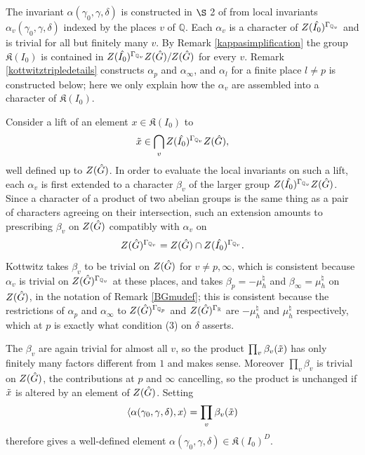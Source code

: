 \documentclass[11pt,a4paper]{article}
\theoremstyle{definition}
\theoremstyle{plain}
\theoremstyle{remark}
\theoremstyle{plain}
\begin{document}
The invariant $\alpha(\gamma_0, \gamma, \delta)$ is constructed in $\S$ 2 of \cite{MR1044820} from local invariants $\alpha_v(\gamma_0,\gamma,\delta)$ indexed by the places $v$ of $\mathbb{Q}$. Each $\alpha_v$ is a character of $Z(\Hat{I_0})^{\Gamma_{\mathbb{Q}_v}}$ and is trivial for all but finitely many $v$. By Remark \ref{kappasimplification} the group $\mathfrak{K}(I_0)$ is contained in $Z(\Hat{I_0})^{\Gamma_{\mathbb{Q}_v}}Z(\Hat{G})/Z(\Hat{G})$ for every $v$. Remark \ref{kottwitztripledetails} constructs $\alpha_p$ and $\alpha_{\infty}$, and $\alpha_l$ for a finite place $l \neq p$ is constructed below; here we only explain how the $\alpha_v$ are assembled into a character of $\mathfrak{K}(I_0)$.

Consider a lift of an element $x \in \mathfrak{K}(I_0)$ to
$$\Tilde{x} \in \bigcap_v Z(\Hat{I_0})^{\Gamma_{\mathbb{Q}_v}} Z(\Hat{G}),$$
well defined up to $Z(\Hat{G})$. In order to evaluate the local invariants on such a lift, each $\alpha_v$ is first extended to a character $\beta_v$ of the larger group $Z(\Hat{I_0})^{\Gamma_{\mathbb{Q}_v}} Z(\Hat{G})$. Since a character of a product of two abelian groups is the same thing as a pair of characters agreeing on their intersection, such an extension amounts to prescribing $\beta_v$ on $Z(\Hat{G})$ compatibly with $\alpha_v$ on
$$Z(\Hat{G})^{\Gamma_{\mathbb{Q}_v}} = Z(\Hat{G}) \cap Z(\Hat{I_0})^{\Gamma_{\mathbb{Q}_v}}.$$
Kottwitz takes $\beta_v$ to be trivial on $Z(\Hat{G})$ for $v \neq p, \infty$, which is consistent because $\alpha_v$ is trivial on $Z(\Hat{G})^{\Gamma_{\mathbb{Q}_v}}$ at these places, and takes $\beta_p = -\mu_h^{\natural}$ and $\beta_{\infty} = \mu_h^{\natural}$ on $Z(\Hat{G})$, in the notation of Remark \ref{BGmudef}; this is consistent because the restrictions of $\alpha_p$ and $\alpha_{\infty}$ to $Z(\Hat{G})^{\Gamma_{\mathbb{Q}_p}}$ and $Z(\Hat{G})^{\Gamma_{\mathbb{R}}}$ are $-\mu_h^{\natural}$ and $\mu_h^{\natural}$ respectively, which at $p$ is exactly what condition (3) on $\delta$ asserts.

The $\beta_v$ are again trivial for almost all $v$, so the product $\prod_v \beta_v(\Tilde{x})$ has only finitely many factors different from $1$ and makes sense. Moreover $\prod_v \beta_v$ is trivial on $Z(\Hat{G})$, the contributions at $p$ and $\infty$ cancelling, so the product is unchanged if $\Tilde{x}$ is altered by an element of $Z(\Hat{G})$. Setting
$$\langle \alpha(\gamma_0, \gamma, \delta), x \rangle = \prod_v \beta_v(\Tilde{x})$$
therefore gives a well-defined element $\alpha(\gamma_0, \gamma, \delta) \in \mathfrak{K}(I_0)^D$.
\end{document}
